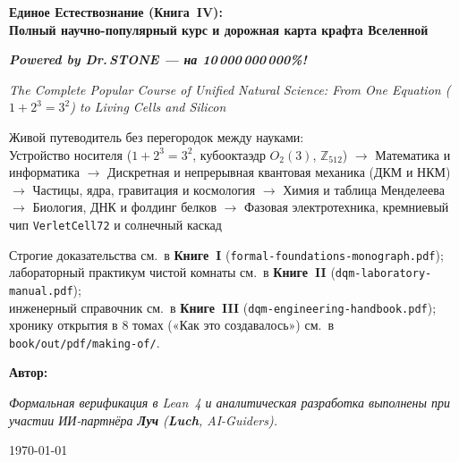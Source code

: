 \begin{titlepage}
  \centering
  \vspace*{1.6cm}
  {\LARGE\bfseries Единое Естествознание (Книга~IV):\\ Полный научно-популярный курс и дорожная карта крафта Вселенной\par}
  \vspace{0.35cm}
  {\Large\bfseries\itshape Powered by Dr.\,STONE --- на 10\,000\,000\,000\%!\par}
  \vspace{0.4cm}
  {\normalsize\itshape The Complete Popular Course of Unified Natural Science: From One Equation ($1 + 2^3 = 3^2$) to Living Cells and Silicon\par}
  \vspace{0.7cm}
  {\large Живой путеводитель без перегородок между науками:\\
  Устройство носителя ($1+2^3=3^2$, кубооктаэдр $O_2(3)$, $\mathbb{Z}_{512}$) $\to$ Математика и информатика $\to$ Дискретная и непрерывная квантовая механика (ДКМ и НКМ) $\to$ Частицы, ядра, гравитация и космология $\to$ Химия и таблица Менделеева $\to$ Биология, ДНК и фолдинг белков $\to$ Фазовая электротехника, кремниевый чип \texttt{VerletCell72} и солнечный каскад\par}
  \vspace{0.8cm}
  {\normalsize Строгие доказательства см.\ в \textbf{Книге~I} (\texttt{formal-foundations-monograph.pdf});\\
  лабораторный практикум чистой комнаты см.\ в \textbf{Книге~II} (\texttt{dqm-laboratory-manual.pdf});\\
  инженерный справочник см.\ в \textbf{Книге~III} (\texttt{dqm-engineering-handbook.pdf});\\
  хронику открытия в 8 томах («Как это создавалось») см.\ в \texttt{book/out/pdf/making-of/}.\par}
  \vfill
  {\large\bfseries Автор: \bookauthorfullname\par}
  \vspace{0.2cm}
  {\footnotesize\itshape Формальная верификация в Lean~4 и аналитическая разработка выполнены при участии ИИ-партнёра \textbf{Луч} (\textbf{Luch}, AI-Guiders).\par}
  \vspace{0.3cm}
  {\large \today\par}
\end{titlepage}
\clearpage

\clearpage
\tableofcontents
\clearpage

